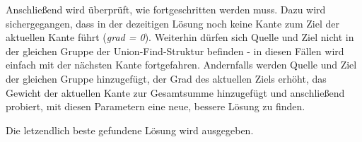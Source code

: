 \documentclass[12pt]{scrartcl}
\begin{document}
      \vspace{12pt}\noindent
      Anschlie{\ss}end wird {\"u}berpr{\"u}ft, wie fortgeschritten werden muss. Dazu wird sichergegangen, dass in der dezeitigen L{\"o}sung noch keine Kante zum Ziel der aktuellen Kante f{\"u}hrt (\textit{grad = 0}). Weiterhin d{\"u}rfen sich Quelle und Ziel nicht in der gleichen Gruppe der Union-Find-Struktur befinden - in diesen F{\"a}llen wird einfach mit der n{\"a}chsten Kante fortgefahren. Andernfalls werden Quelle und Ziel der gleichen Gruppe hinzugef{\"u}gt, der Grad des aktuellen Ziels erh{\"o}ht, das Gewicht der aktuellen Kante zur Gesamtsumme hinzugef{\"u}gt und anschlie{\ss}end probiert, mit diesen Parametern eine neue, bessere L{\"o}sung zu finden. 

      \vspace{12pt}\noindent
      Die letzendlich beste gefundene L{\"o}sung wird ausgegeben.
\end{document}
